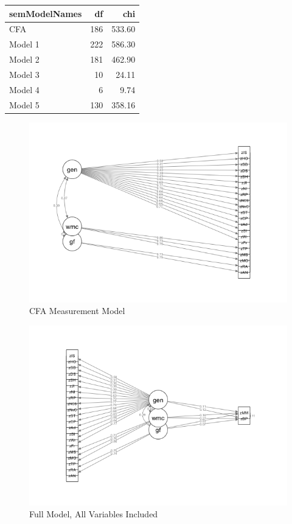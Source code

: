 \documentclass[]{book}
\begin{document}
\begin{tabular}{l|r|r}
\hline
semModelNames & df & chi\\
\hline
CFA & 186 & 533.60\\
\hline
Model 1 & 222 & 586.30\\
\hline
Model 2 & 181 & 462.90\\
\hline
Model 3 & 10 & 24.11\\
\hline
Model 4 & 6 & 9.74\\
\hline
Model 5 & 130 & 358.16\\
\hline
\end{tabular}

\begin{figure}

{\centering \includegraphics[width=1\linewidth]{img/measurementModel} 

}

\caption{CFA Measurement Model}\label{fig:measurementmodel}
\end{figure}

\begin{figure}

{\centering \includegraphics[width=1\linewidth]{img/sem1} 

}

\caption{Full Model, All Variables Included}\label{fig:model1}
\end{figure}
\end{document}
